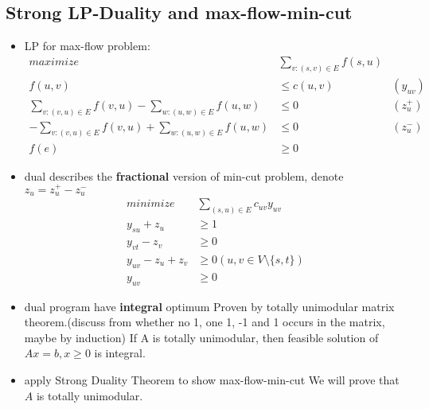 \subsection{Strong LP-Duality and max-flow-min-cut}
\begin{itemize}
    \item LP for max-flow problem:
    \[
        \begin{aligned}
        maximize & \sum_{v:(s,v)\in E} f(s,u) \\
        f(u,v)&\leq c(u,v) &(y_{uv})   \\
        \sum_{v:(v,u)\in E} f(v,u)-\sum_{w:(u,w)\in E} f(u,w)&\leq 0 &(z_u^+)\\
        -\sum_{v:(v,u)\in E} f(v,u)+\sum_{w:(u,w)\in E} f(u,w)&\leq 0 &(z_u^-)\\
        f(e)&\geq 0
        \end{aligned}
    \]
    \item dual describes the \textbf{fractional} version of min-cut problem, denote $z_u=z_u^+-z_u^-$
    \[
        \begin{aligned}
            minimize &\sum_{(s,u)\in E} c_{uv}y_{uv}\\
        y_{su}+z_u&\geq 1\\
        y_{vt}-z_v&\geq 0\\
        y_{uv}-z_u+z_v&\geq 0 (u,v\in V \setminus\{ s,t\})\\
        y_{uv}&\geq0
        \end{aligned}
    \]
    \item dual program have \textbf{integral} optimum
    Proven by totally unimodular matrix theorem.(discuss from whether no 1, one 1, -1 and 1 occurs in the matrix, maybe by induction)
    If A is totally unimodular, then feasible solution of $Ax=b, x\geq 0$ is integral.

    \item apply Strong Duality Theorem to show max-flow-min-cut
    We will prove that $A$ is totally unimodular.
\end{itemize}
